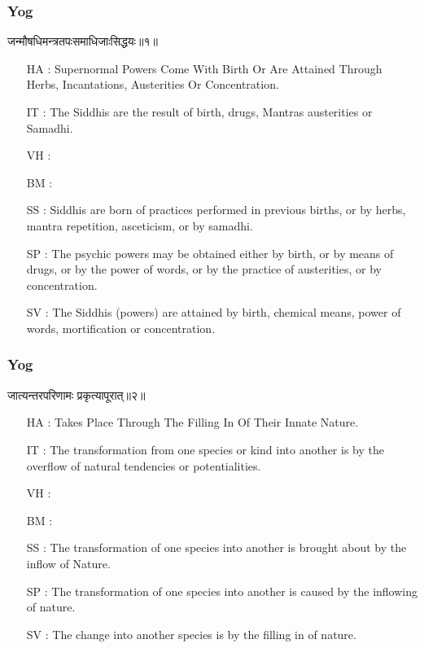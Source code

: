 \begin{frame}[fragile]\frametitle{Yog}
\begin{sanskrit}
जन्मौषधिमन्त्रतपःसमाधिजाःसिद्धयः॥१॥
\end{sanskrit}

	\begin{itemize}
	\item [HA]: Supernormal Powers Come With Birth Or Are Attained Through Herbs, Incantations, Austerities Or Concentration.
	\item [IT]: The Siddhis are the result of birth, drugs, Mantras austerities or Samadhi.
	\item [VH]: 
	\item [BM]: 
	\item [SS]: Siddhis are born of practices performed in previous births, or by herbs, mantra repetition, asceticism, or by samadhi.
	\item [SP]: The psychic powers may be obtained either by birth, or by means of drugs, or by the power of words, or by the practice of austerities, or by concentration.
	\item [SV]: The Siddhis (powers) are attained by birth, chemical means, power of words, mortification or concentration. 
	\end{itemize}
\end{frame}


\begin{frame}[fragile]\frametitle{Yog}
\begin{sanskrit}
जात्यन्तरपरिणामः प्रकृत्यापूरात्॥२॥
\end{sanskrit}

	\begin{itemize}
	\item [HA]: Takes Place Through The Filling In Of Their Innate Nature.
	\item [IT]: The transformation from one species or kind into another is by the overflow of natural tendencies or potentialities.
	\item [VH]: 
	\item [BM]: 
	\item [SS]: The transformation of one species into another is brought about by the inflow of Nature.
	\item [SP]: The transformation of one species into another is caused by the inflowing of nature.
	\item [SV]: The change into another species is by the filling in of nature. 
	\end{itemize}
\end{frame}

